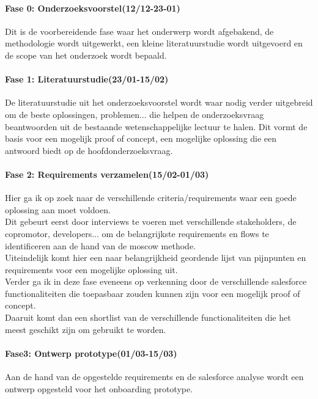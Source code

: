 \paragraph{Fase 0: Onderzoeksvoorstel(12/12-23-01)}

Dit is de voorbereidende fase waar het onderwerp wordt afgebakend, de methodologie wordt uitgewerkt, een kleine literatuurstudie wordt uitgevoerd en de scope van het onderzoek wordt bepaald.

\paragraph{Fase 1: Literatuurstudie(23/01-15/02)}     
De literatuurstudie uit het onderzoeksvoorstel wordt waar nodig verder uitgebreid om de beste oplossingen, problemen... die helpen de onderzoeksvraag beantwoorden uit de bestaande wetenschappelijke lectuur te halen. Dit vormt de basis voor een mogelijk proof of concept, een mogelijke oplossing die een antwoord biedt op de hoofdonderzoeksvraag. 

\paragraph{Fase 2: Requirements verzamelen(15/02-01/03)}

Hier ga ik op zoek naar de verschillende criteria/requirements waar een goede oplossing aan moet voldoen.
\\

Dit gebeurt eerst door interviews te voeren met verschillende stakeholders, de copromotor, developers... om de belangrijkste requirements en flows te identificeren aan de hand van de moscow methode. 
\\

Uiteindelijk komt hier een naar belangrijkheid geordende lijst van pijnpunten en requirements voor een mogelijke oplossing uit.
\\

Verder ga ik in deze fase eveneens op verkenning door de verschillende salesforce functionaliteiten die toepasbaar zouden kunnen zijn voor een mogelijk proof of concept. 
\\
Daaruit komt dan een shortlist van de verschillende functionaliteiten die het meest geschikt zijn om gebruikt te worden.

\paragraph{Fase3: Ontwerp prototype(01/03-15/03)}
Aan de hand van de opgestelde requirements en de salesforce analyse wordt een ontwerp opgesteld voor het onboarding prototype.
\\

